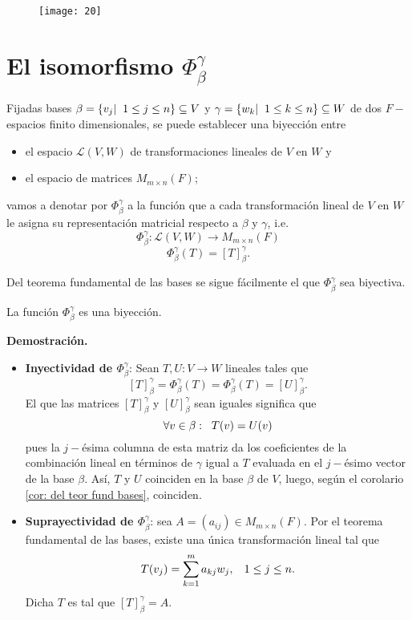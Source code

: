 \begin{figure}[H]
	\centering
	\texttt{[image: 20]} 
\end{figure}	

\section{El isomorfismo $\Phi_{\beta}^{\gamma}$}

Fijadas bases $\beta = \{ v_{j}  | \hspace{0.2cm} 1 \leq j \leq n \}
 \subseteq V$ y $\gamma 
= \{ w_{k}  | \hspace{0.2cm} 1 \leq k \leq n \} 
 \subseteq W$ de dos 
$F-$espacios finito dimensionales, se puede establecer una biyección
entre
\begin{itemize}
	\item el espacio $\mathcal{L}(V, W)$ de transformaciones lineales
	de $V$ en $W$ y 
	\item el espacio de matrices $M_{m \times n}(F)$;
\end{itemize}
vamos a denotar por 
$\Phi_{\beta}^{\gamma}$ a la función que a cada 
transformación lineal de $V$ en $W$ le asigna su representación
matricial respecto a $\beta$ y $\gamma$, i.e.
\[
\Phi_{\beta}^{\gamma} : \mathcal{L}(V, W) \longrightarrow M_{m \times n}(F)
\]
\[
\Phi_{\beta}^{\gamma}(T) = [T]_{\beta}^{\gamma}.
\]

Del teorema fundamental de las bases se sigue fácilmente
el que $\Phi_{\beta}^{\gamma}$ sea biyectiva.

\begin{prop}
La función $\Phi_{\beta}^{\gamma}$ es una biyección.
\end{prop}
\noindent
\textbf{Demostración.}
\begin{itemize}
	\item \textbf{Inyectividad de $\Phi_{\beta}^{\gamma}$}:
	Sean $T, U : V \longrightarrow W$ lineales tales que 
	\[
	[T]_{\beta}^{\gamma} = \Phi_{\beta}^{\gamma}(T)
	= \Phi_{\beta}^{\gamma}(T) = [U]_{\beta}^{\gamma}.
	\]
	El que las matrices $[T]_{\beta}^{\gamma}$ y 
$[U]_{\beta}^{\gamma}$ sean iguales significa que 
\[
\forall v \in \beta : \hspace{0.2cm} T(v) = U(v)
\]
pues la $j-$ésima columna de esta matriz da los coeficientes 
de la combinación lineal en términos de $\gamma$ igual a $T$ evaluada en el
$j-$ésimo vector de la base $\beta$. Así, $T$ y $U$ coinciden en la 
base $\beta$ de $V$, luego, según el corolario 
\ref{cor: del teor fund bases}, coinciden.
	\item \textbf{Suprayectividad de $\Phi_{\beta}^{\gamma}$}:
	sea $A = (a_{ij}) \in M_{m \times n}(F)$. Por el teorema fundamental 
	de las bases, 
	existe una única
transformación lineal tal que 
\[
T(v_{j}) = \sum_{k = 1}^{m} a_{kj} w_{j}, \hspace{0.3cm}
1 \leq j \leq n.
\]
Dicha $T$ es tal que $[T]_{\beta}^{\gamma} = A$.
\end{itemize}

